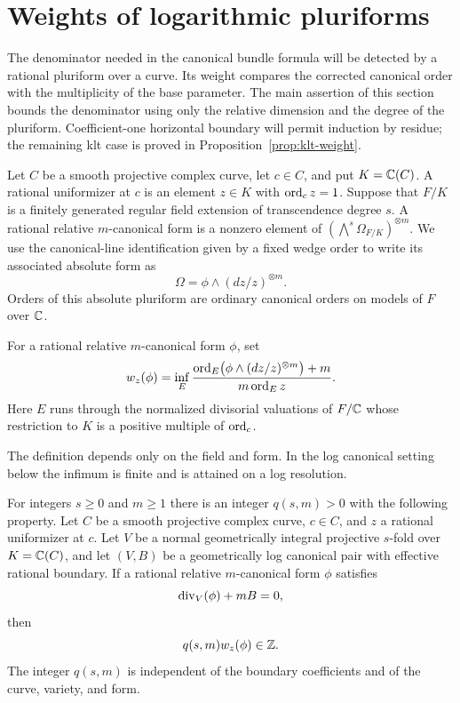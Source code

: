 \section{Weights of logarithmic pluriforms}\label{sec:weights}

The denominator needed in the canonical bundle formula will be detected
by a rational pluriform over a curve.  Its weight compares the corrected
canonical order with the multiplicity of the base parameter.  The
main assertion of this section bounds the denominator using only the
relative dimension and the degree of the pluriform.  Coefficient-one
horizontal boundary will permit induction by residue; the remaining
klt case is proved in Proposition~\ref{prop:klt-weight}.

Let $C$ be a smooth projective complex curve, let $c\in C$, and put
$K=\mathbb C(C)$.  A rational uniformizer at $c$ is an element $z\in K$ with
$\operatorname{ord}_c z=1$.  Suppose that $F/K$ is a finitely generated regular field
extension of transcendence degree $s$.  A rational relative
$m$-canonical form is a nonzero element of
$(\bigwedge^s\Omega_{F/K})^{\otimes m}$.  We use the canonical-line
identification given by a fixed wedge order to write its associated
absolute form as
\[
                  \Omega=\phi\wedge(dz/z)^{\otimes m}.
\]
Orders of this absolute pluriform are ordinary canonical orders on
models of $F$ over $\mathbb C$.

\begin{definition}\label{def:weight}
For a rational relative $m$-canonical form $\phi$, set
\begin{equation}\label{eq:weight-definition}
 w_z(\phi)=\inf_E
 \frac{\operatorname{ord}_E\bigl(\phi\wedge(dz/z)^{\otimes m}\bigr)+m}
      {m\operatorname{ord}_E z}.
\end{equation}
Here $E$ runs through the normalized divisorial valuations of $F/\mathbb C$
whose restriction to $K$ is a positive multiple of $\operatorname{ord}_c$.
\end{definition}

The definition depends only on the field and form.  In the log canonical
setting below the infimum is finite and is attained on a log resolution.

\begin{theorem}\label{thm:weight}
For integers $s\ge0$ and $m\ge1$ there is an integer $q(s,m)>0$
with the following property.  Let $C$ be a smooth projective complex
curve, $c\in C$, and $z$ a rational uniformizer at $c$.  Let $V$ be a
normal geometrically integral projective $s$-fold over $K=\mathbb C(C)$,
and let $(V,B)$ be a geometrically log canonical pair with effective
rational boundary.  If a rational relative $m$-canonical form $\phi$
satisfies
\begin{equation}\label{eq:weight-log-trivialization}
                         \operatorname{div}_V(\phi)+mB=0,
\end{equation}
then
\[
                            q(s,m)w_z(\phi)\in\mathbb Z.
\]
The integer $q(s,m)$ is independent of the boundary coefficients and
of the curve, variety, and form.
\end{theorem}

